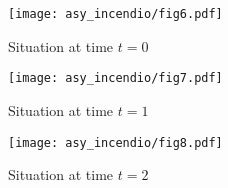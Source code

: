 \begin{center}
	\begin{minipage}{0.3\linewidth}
		\texttt{[image: asy\_incendio/fig6.pdf]}
		\caption*{Situation at time $t=0$}
	\end{minipage}
	\hspace{0.03\linewidth}
	\begin{minipage}{0.3\linewidth}
		\texttt{[image: asy\_incendio/fig7.pdf]}
		\caption*{Situation at time $t=1$}
	\end{minipage}
	\hspace{0.03\linewidth}
	\begin{minipage}{0.3\linewidth}
		\texttt{[image: asy\_incendio/fig8.pdf]}
		\caption*{Situation at time $t=2$}
	\end{minipage}
\end{center}
